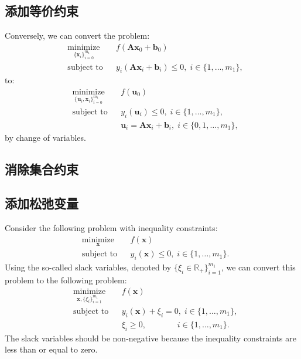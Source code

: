 \documentclass[lang=cn,10pt]{gorgeousnbook}
\numberwithin{equation}{section}%
\numberwithin{figure}{section}%
\begin{document}
\subsection{添加等价约束}
Conversely, we can convert the problem:
\begin{equation}
\begin{aligned}
& \underset{\{\boldsymbol{x}_i\}_{i=0}^{m_1}}{\text{minimize}}
& & f(\boldsymbol{A}\boldsymbol{x}_0 + \boldsymbol{b}_0) \\
& \text{subject to}
& & y_i(\boldsymbol{A}\boldsymbol{x}_i + \boldsymbol{b}_i) \leq 0, \; i \in \{1, \ldots, m_1\},
\end{aligned}
\end{equation}
to:
\begin{equation}
\begin{aligned}
& \underset{\{\boldsymbol{u}_i, \boldsymbol{x}_i\}_{i=0}^{m_1}}{\text{minimize}}
& & f(\boldsymbol{u}_0) \\
& \text{subject to}
& & y_i(\boldsymbol{u}_i) \leq 0, \; i \in \{1, \ldots, m_1\}, \\
& & & \boldsymbol{u}_i = \boldsymbol{A}\boldsymbol{x}_i + \boldsymbol{b}_i,\; i \in \{0, 1, \ldots, m_1\},
\end{aligned}
\end{equation}
by change of variables. 
\subsection{消除集合约束}

\subsection{添加松弛变量}
Consider the following problem with inequality constraints:
\begin{equation}
\begin{aligned}
& \underset{\boldsymbol{x}}{\text{minimize}}
& & f(\boldsymbol{x}) \\
& \text{subject to}
& & y_i(\boldsymbol{x}) \leq 0, \; i \in \{1, \ldots, m_1\}.
\end{aligned}
\end{equation}
Using the so-called slack variables, denoted by $\{\xi_i \in \mathbb{R}_+\}_{i=1}^{m_1}$, we can convert this problem to the following problem:
\begin{equation}
\begin{aligned}
& \underset{\boldsymbol{x}, \{\xi_i\}_{i=1}^{m_1}}{\text{minimize}}
& & f(\boldsymbol{x}) \\
& \text{subject to}
& & y_i(\boldsymbol{x}) + \xi_i = 0, \; i \in \{1, \ldots, m_1\}, \\
& & & \xi_i \geq 0, \quad\qquad\,\,\, \; i \in \{1, \ldots, m_1\}.
\end{aligned}
\end{equation}
The slack variables should be non-negative because the inequality constraints are less than or equal to zero. 
\end{document}
